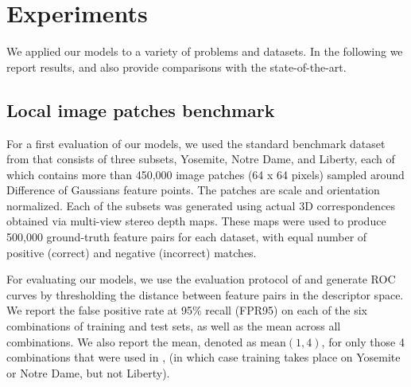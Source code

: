 \documentclass[10pt,twocolumn,letterpaper]{article}
\begin{document}
%
%
%
%
%
%
%
%
%
%
%
%

\section{Experiments}

We applied our models to a variety of problems and datasets. In the following we report results, and also provide comparisons with the state-of-the-art.

\subsection{Local image patches benchmark}
For a first evaluation of our models, we used the standard benchmark dataset from \cite{BHW10} that consists of three subsets, Yosemite, Notre Dame, and Liberty, each of 
which contains more than 450,000 image patches (64 x 64 pixels) sampled around 
Difference of Gaussians feature points. The patches are  scale and  orientation normalized. 
%
Each of the subsets was generated using actual 3D correspondences obtained via multi-view stereo depth maps. 
These maps were used to produce 500,000 ground-truth feature 
pairs for each dataset, with equal number of positive (correct) and negative (incorrect) matches.

For evaluating  our models, we use the evaluation
protocol of \cite{Brown11} and generate ROC curves by thresholding the distance between 
feature pairs in the descriptor space. We report the false positive rate at 
95\% recall (FPR95) on each of the six combinations of training and test sets, 
as well as the mean across all combinations. We also report the mean, denoted as $\mathrm{mean}(1,4)$, for only those 4 combinations that were used in \cite{Boix13CVPR}, \cite{BHW10}  (in which case training takes place on Yosemite or Notre Dame, but not 
Liberty).
\end{document}
